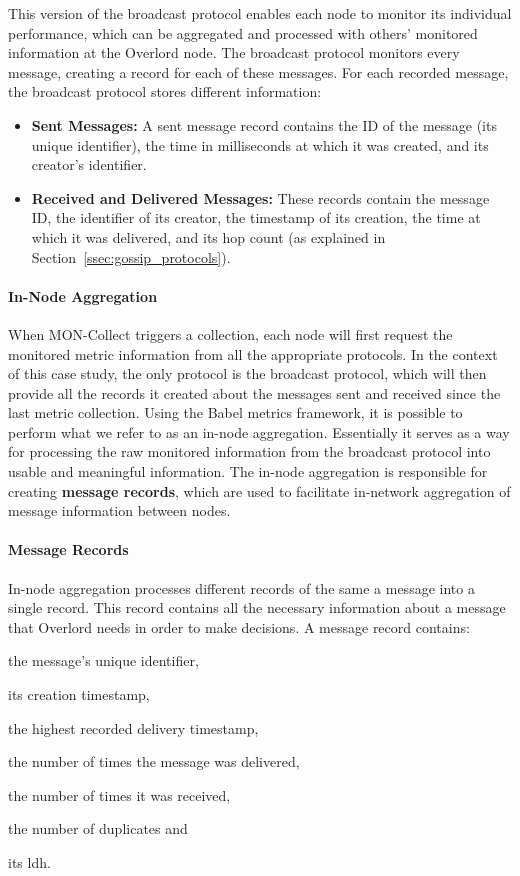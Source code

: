 This version of the broadcast protocol enables each node to monitor its individual performance, which can be aggregated and processed with others' monitored information at the Overlord node. The broadcast protocol monitors every message, creating a record for each of these messages. For each recorded message, the broadcast protocol stores different information:
\begin{itemize}
    \item \textbf{Sent Messages:} A sent message record contains the ID of the message (its unique identifier), the time in milliseconds at which it was created, and its creator's identifier.
    \item \textbf{Received and Delivered Messages:} These records contain the message ID, the identifier of its creator, the timestamp of its creation, the time at which it was delivered, and its hop count (as explained in Section~\ref{ssec:gossip_protocols}).
\end{itemize}

\paragraph{In-Node Aggregation} \label{par:in_node_aggregation} When MON-Collect triggers a collection, each node will first request the monitored metric information from all the appropriate protocols. In the context of this case study, the only protocol is the broadcast protocol, which will then provide all the records it created about the messages sent and received since the last metric collection. Using the Babel metrics framework, it is possible to perform what we refer to as an in-node aggregation. Essentially it serves as a way for processing the raw monitored information from the broadcast protocol into usable and meaningful information. The in-node aggregation is responsible for creating \textbf{message records}, which are used to facilitate in-network aggregation of message information between nodes.

\paragraph{Message Records} \label{par:message_record} In-node aggregation processes different records of the same a message into a single record. This record contains all the necessary information about a message that Overlord needs in order to make decisions. A message record contains: \begin{inparaenum}[(i)] \item the message's unique identifier, \item its creation timestamp, \item the highest recorded delivery timestamp, \item the number of times the message was delivered, \item the number of times it was received, \item the number of duplicates and \item its \gls{ldh}.\end{inparaenum}


